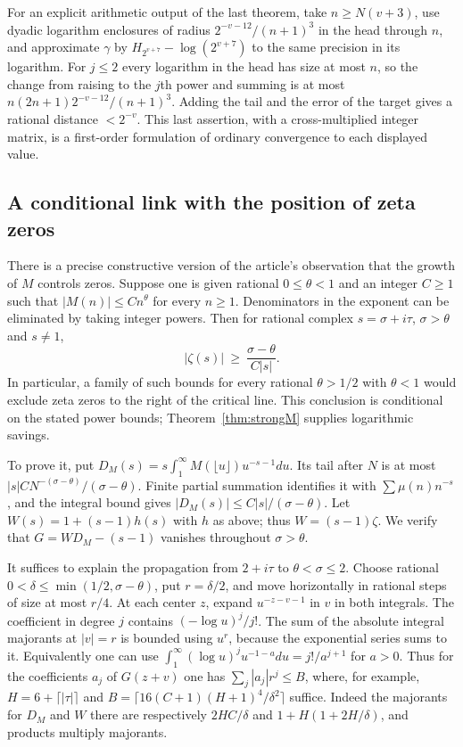 For an explicit arithmetic output of the last theorem, take $n\ge N(v+3)$,
use dyadic logarithm enclosures of radius
$2^{-v-12}/(n+1)^3$ in the head through $n$, and approximate $\gamma$
by $H_{2^{v+7}}-\log(2^{v+7})$ to the same precision in its logarithm.
For $j\le2$ every logarithm in the head has size at most $n$, so the
change from raising to the $j$th power and summing is at most
$n(2n+1)2^{-v-12}/(n+1)^3$. Adding the tail and the error of the target
gives a rational distance $<2^{-v}$. This last assertion, with a
cross-multiplied integer matrix, is a first-order formulation of
ordinary convergence to each displayed value.

\subsection{A conditional link with the position of zeta zeros}

There is a precise constructive version of the article's observation
that the growth of $M$ controls zeros. Suppose one is given rational
$0\le\theta<1$ and an integer $C\ge1$ such that
$|M(n)|\le C n^\theta$ for every $n\ge1$. Denominators in the exponent
can be eliminated by taking integer powers. Then for rational complex
$s=\sigma+i\tau$, $\sigma>\theta$ and $s\ne1$,
\[
       |\zeta(s)|\ \ge\ \frac{\sigma-\theta}{C|s|}.
\]
In particular, a family of such bounds for every rational
$\theta>1/2$ with $\theta<1$ would exclude zeta zeros to the right
of the critical line. This conclusion is conditional on the stated
power bounds; Theorem~\ref{thm:strongM} supplies logarithmic savings.

To prove it, put $D_M(s)=s\int_1^\infty M(\lfloor u\rfloor)u^{-s-1}du$.
Its tail after $N$ is at most $|s|CN^{-(\sigma-\theta)}/(\sigma-\theta)$.
Finite partial summation identifies it with $\sum\mu(n)n^{-s}$, and
the integral bound gives $|D_M(s)|\le C|s|/(\sigma-\theta)$.
Let $W(s)=1+(s-1)h(s)$ with $h$ as above; thus $W=(s-1)\zeta$.
We verify that $G=W D_M-(s-1)$ vanishes throughout $\sigma>\theta$.

It suffices to explain the propagation from $2+i\tau$ to
$\theta<\sigma\le2$. Choose rational
$0<\delta\le\min(1/2,\sigma-\theta)$, put $r=\delta/2$, and move
horizontally in rational steps of size at most $r/4$.
At each center $z$, expand $u^{-z-v-1}$ in $v$ in both integrals.
The coefficient in degree $j$ contains $( -\log u)^j/j!$.
The sum of the absolute integral majorants at $|v|=r$ is bounded
using $u^r$, because the exponential series sums to it. Equivalently
one can use
$\int_1^\infty(\log u)^j u^{-1-a}du=j!/a^{j+1}$ for $a>0$.
Thus for the coefficients $a_j$ of $G(z+v)$ one has
$\sum_j |a_j| r^j\le B$, where, for example,
$H=6+\lceil|\tau|\rceil$ and
$B=\lceil16(C+1)(H+1)^4/\delta^2\rceil$ suffice.
Indeed the majorants for $D_M$ and $W$ there are respectively
$2HC/\delta$ and $1+H(1+2H/\delta)$, and products multiply majorants.

